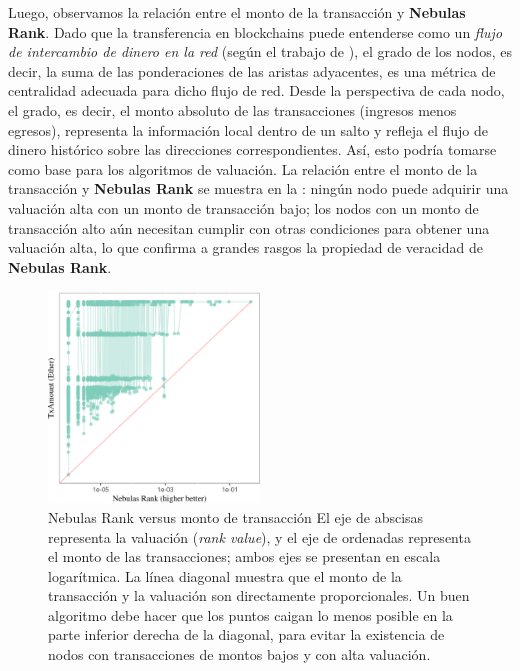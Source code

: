 Luego, observamos la relación entre el monto de la transacción y \textbf{Nebulas Rank}. Dado que la transferencia en blockchains puede entenderse como un \textit{flujo de intercambio de dinero en la red} (según el trabajo de \cite{Borgatti2005}), el grado de los nodos, es decir, la suma de las ponderaciones de las aristas adyacentes, es una métrica de centralidad adecuada para dicho flujo de red. Desde la perspectiva de cada nodo, el grado, es decir, el monto absoluto de las transacciones (ingresos menos egresos), representa la información local dentro de un salto y refleja el flujo de dinero histórico sobre las direcciones correspondientes. Así, esto podría tomarse como base para los algoritmos de valuación. La relación entre el monto de la transacción y \textbf{Nebulas Rank} se muestra en la : ningún nodo puede adquirir una valuación alta con un monto de transacción bajo; los nodos con un monto de transacción alto aún necesitan cumplir con otras condiciones para obtener una valuación alta, lo que confirma a grandes rasgos la propiedad de veracidad de \textbf{Nebulas Rank}.

\begin{figure}[!htbp]
	\centering
	\includegraphics[width=0.50\textwidth]{figs/MAY_lr.png}
	\caption{Nebulas Rank versus monto de transacción \small{El eje de abscisas representa la valuación (\textit{rank value}), y el eje de ordenadas representa el monto de las transacciones; ambos ejes se presentan en escala logarítmica. La línea diagonal muestra que el monto de la transacción y la valuación son directamente proporcionales. Un buen algoritmo debe hacer que los puntos caigan lo menos posible en la parte inferior derecha de la diagonal, para evitar la existencia de nodos con transacciones de montos bajos y con alta valuación.}}\label{fig:nrio}
\end{figure}

